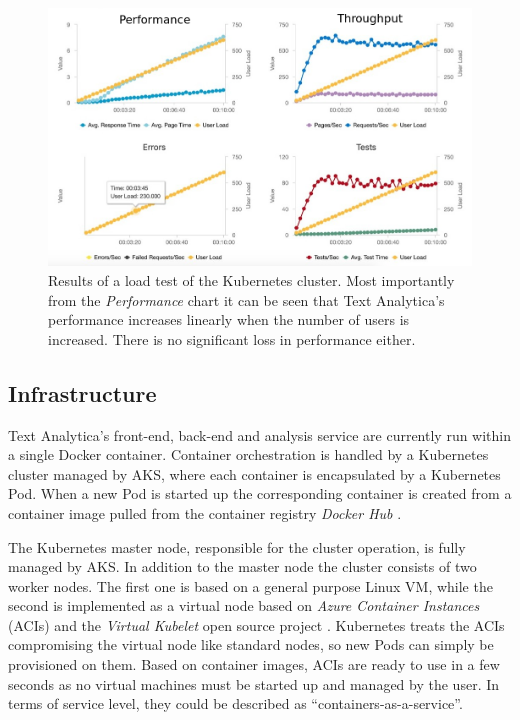 \documentclass[conference]{IEEEtran}
\begin{document}
\begin{figure}[ht!]
\includegraphics[width=170mm]{img/loadtest_01.png}
\caption{Results of a load test of the Kubernetes cluster. Most importantly from the \textit{Performance} chart it can be seen that Text Analytica's performance increases linearly when the number of users is increased. There is no significant loss in performance either.}
\label{img:loadtesting}
\end{figure}

\subsection{Infrastructure}
\label{subsec:infra}
Text Analytica's front-end, back-end and analysis service are currently run within a single Docker container. Container orchestration is handled by a Kubernetes cluster managed by AKS, where each container is encapsulated by a Kubernetes Pod. When a new Pod is started up the corresponding container is created from a container image pulled from the container registry \textit{Docker Hub} \cite{DockerHub}.

The Kubernetes master node, responsible for the cluster operation, is fully managed by AKS. In addition to the master node the cluster consists of two worker nodes. The first one is based on a general purpose Linux VM, while the second is implemented as a virtual node based on \textit{Azure Container Instances} (ACIs) \cite{AzureContainerInstances} and the \textit{Virtual Kubelet} open source project \cite{VirtualKubelet, VirtualKubeletGithub}. Kubernetes treats the ACIs compromising the virtual node like standard nodes, so new Pods can simply be provisioned on them. Based on container images, ACIs are ready to use in a few seconds as no virtual machines must be started up and managed by the user. In terms of service level, they could be described as “containers-as-a-service”.
\end{document}
